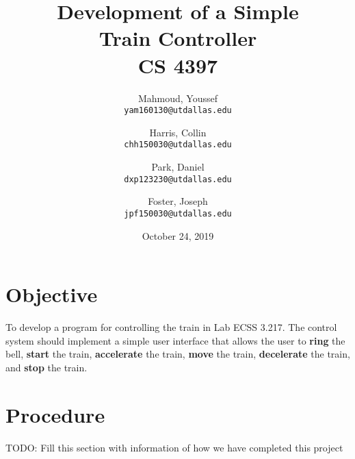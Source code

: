 \documentclass{article}
\author{
	Mahmoud, Youssef\\
	\texttt{yam160130@utdallas.edu}
	\and
	Harris, Collin\\
	\texttt{chh150030@utdallas.edu}
	\and
	Park, Daniel\\
	\texttt{dxp123230@utdallas.edu}
	\and
	Foster, Joseph\\
	\texttt{jpf150030@utdallas.edu} %
}
\date{October 24, 2019}
\title{
  \textbf{
    Development of a Simple \\ Train Controller \\ CS 4397
  }
}
\begin{document}
  \maketitle

  \section{Objective}
    To develop a program for controlling the train in Lab ECSS 3.217. The control system
		should implement a simple user interface that allows the user to \textbf{ring} the
		bell, \textbf{start} the train, \textbf{accelerate} the train, \textbf{move} the
		train, \textbf{decelerate} the train, and \textbf{stop} the train.

  \section{Procedure}
	  TODO: Fill this section with information of how we have completed this project
\end{document}
